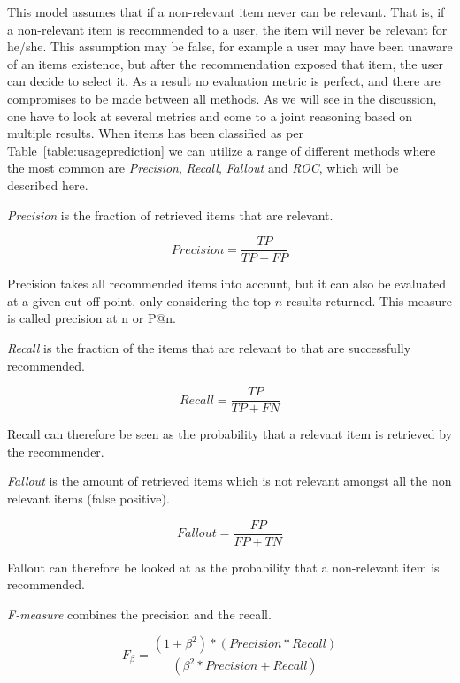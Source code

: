 This model assumes that if a non-relevant item never can be relevant. That is,
if a non-relevant item is recommended to a user, the item will never be
relevant for he/she. This assumption may be false, for example a user may
have been unaware of an items existence, but after the recommendation exposed
that item, the user can decide to select it. As a result no evaluation metric
is perfect, and there are compromises to be made between all methods. As we
will see in the discussion, one have to look at several metrics and come to a
joint reasoning based on multiple results. When items has been classified as
per Table~\ref{table:usageprediction} we can utilize a range of different
methods where the most common are \textit{Precision}, \textit{Recall},
\textit{Fallout} and \textit{ROC}, which will be described here.

\textit{Precision} is the fraction of retrieved items that are relevant.

\begin{equation}
    Precision = \frac{TP}{TP+FP}
    \label{equation:precision}
\end{equation}

Precision takes all recommended items into account, but it can also be
evaluated at a given cut-off point, only considering the top $n$ results
returned. This measure is called precision at n or P@n.

\textit{Recall} is the fraction of the items that are relevant to that are
successfully recommended.

\begin{equation}
    Recall = \frac{TP}{TP+FN}
    \label{equation:recall}
\end{equation}

Recall can therefore be seen as the probability that a relevant item is
retrieved by the recommender.

\textit{Fallout} is the amount of retrieved items which is not relevant amongst
all the non relevant items (false positive).

\begin{equation}
    Fallout = \frac{FP}{FP+TN}
    \label{equation:fallout}
\end{equation}

Fallout can therefore be looked at as the probability that a non-relevant item
is recommended.

\textit{F-measure} combines the precision and the recall.

\begin{equation}
    F_\beta = \frac{(1 + \beta^2) * (Precision * Recall)}{(\beta^2 * Precision + Recall)}
    \label{equation:f-measure}
\end{equation}

